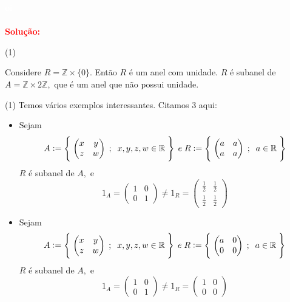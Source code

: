 \documentclass[11pt,a4paper]{article}
\newcommand{\dividiritens}[1]{\begin{tasks}[counter-format={(tsk[a])},label-width=3.6ex, label-format = {\bfseries}, column-sep = {0pt}](1) #1 \end{tasks}}
\newcommand{\pers}[1]{\textcolor{Floresta}{$\negrito{(#1)} $}}
\newcommand{\solucao}[1]{
\textbf{\textcolor{white}{oi}\\ \\ \textcolor{red}{Solução:}} #1}
\begin{document}
\solucao{
  \dividiritens{
\task[\pers{a}] 

\task[\pers{b}] Considere $R = \mathbb{Z} \times \{ 0 \}.$ Então $R$ é um anel com unidade. $R$ é subanel de $A = \mathbb{Z} \times 2 \mathbb{Z},$ que é um anel que não possui unidade.
}
\dividiritens{
\task[\pers{c}] Temos vários exemplos interessantes. Citamos $3$ aqui:
\begin{itemize}
    \item Sejam
    \[
A:=\left\{\;\begin{pmatrix}x&y\\z&w\end{pmatrix}\;;\;\;x,y,z,w\in\Bbb R\;\right\}\; e \;R:=\left\{\;\begin{pmatrix}a&a\\a&a\end{pmatrix}\;;\;\;a\in\Bbb R\;\right\}
    \]
    $R$ é subanel de $A,$ e 
    \[
    1_A = \begin{pmatrix}1&0\\0&1\end{pmatrix} \neq 1_R = \begin{pmatrix}\frac{1}{2}&\frac{1}{2}\\\frac{1}{2}&\frac{1}{2}\end{pmatrix}
    \]
    \end{itemize}
    \begin{itemize}
        \item Sejam
    \[
A:=\left\{\;\begin{pmatrix}x&y\\z&w\end{pmatrix}\;;\;\;x,y,z,w\in\Bbb R\;\right\}\; e \;R:=\left\{\;\begin{pmatrix}a&0\\0&0\end{pmatrix}\;;\;\;a\in\Bbb R\;\right\}
    \]
    $R$ é subanel de $A,$ e 
    \[
    1_A = \begin{pmatrix}1&0\\0&1\end{pmatrix} \neq 1_R = \begin{pmatrix}1&0\\0&0\end{pmatrix}
    \]
    \end{itemize}
\task[\pers{d}]
}


}
\end{document}
